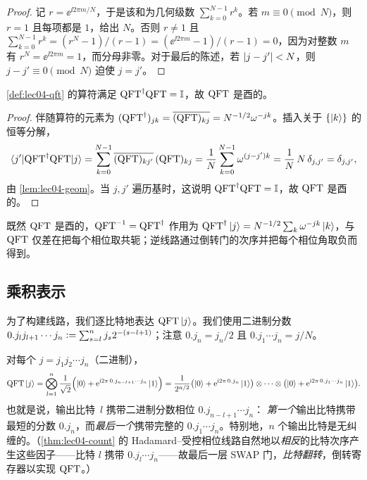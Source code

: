 \begin{proof}
记 $r=\ee^{\ii 2\pi m/N}$，于是该和为几何级数
$\sum_{k=0}^{N-1}r^{k}$。若 $m\equiv0\pmod N$，则 $r=1$ 且每项都是 $1$，给出 $N$。否则 $r\neq1$ 且
$\sum_{k=0}^{N-1}r^{k}=(r^{N}-1)/(r-1)=(\ee^{\ii 2\pi m}-1)/(r-1)=0$，因为对整数 $m$ 有
$r^{N}=\ee^{\ii 2\pi m}=1$，而分母非零。对于最后的陈述，若 $\left\lvert j-j' \right\rvert<N$，则 $j-j'\equiv0\pmod N$ 迫使 $j=j'$。
\end{proof}

\begin{theorem}
\label{thm:lec04-unitary}
\cref{def:lec04-qft} 的算符满足 $\mathrm{QFT}^{\dagger}\mathrm{QFT}=\mathbb{I}$，故 $\mathrm{QFT}$ 是酉的。
\end{theorem}

\begin{proof}
伴随算符的元素为 $(\mathrm{QFT}^{\dagger})_{jk}=\overline{(\mathrm{QFT})_{kj}}
=N^{-1/2}\omega^{-jk}$。插入关于
$\{\ket{k}\}$ 的恒等分解，
\[
  \braket{j'|\mathrm{QFT}^{\dagger}\mathrm{QFT}|j}
   =\sum_{k=0}^{N-1}\overline{(\mathrm{QFT})_{kj'}}\,(\mathrm{QFT})_{kj}
   =\frac{1}{N}\sum_{k=0}^{N-1}\omega^{(j-j')k}
   =\frac{1}{N}\,N\,\delta_{j,j'}=\delta_{j,j'},
\]
由 \cref{lem:lec04-geom}。当 $j,j'$ 遍历基时，这说明
$\mathrm{QFT}^{\dagger}\mathrm{QFT}=\mathbb{I}$，故 $\mathrm{QFT}$ 是酉的。
\end{proof}

既然 $\mathrm{QFT}$ 是酉的，$\mathrm{QFT}^{-1}=\mathrm{QFT}^{\dagger}$ 作用为
$\mathrm{QFT}^{\dagger}\ket{j}=N^{-1/2}\sum_k\omega^{-jk}\ket{k}$，与 $\mathrm{QFT}$ 仅差在把每个相位取共轭；逆线路通过倒转门的次序并把每个相位角取负而得到。

\subsection*{乘积表示}

为了构建线路，我们逐比特地表达 $\mathrm{QFT}\ket{j}$。我们使用二进制分数
$0.j_l j_{l+1}\cdots j_n\vcentcolon=\sum_{s=l}^{n} j_s 2^{-(s-l+1)}$；注意
$0.j_n=j_n/2$ 且 $0.j_1\cdots j_n=j/N$。

\begin{theorem}[乘积表示]
\label{thm:lec04-product}
对每个 $j=j_1 j_2\cdots j_n$（二进制），
\[
  \mathrm{QFT}\ket{j}
   =\bigotimes_{l=1}^{n}
     \frac{1}{\sqrt2}\Bigl(\ket{0}+\mathrm{e}^{\mathrm{i} 2\pi\,0.j_{n-l+1}\cdots j_n}\ket{1}\Bigr)
   =\frac{1}{2^{n/2}}
     \bigl(\ket{0}+\mathrm{e}^{\mathrm{i} 2\pi\,0.j_n}\ket{1}\bigr)\otimes\cdots\otimes
     \bigl(\ket{0}+\mathrm{e}^{\mathrm{i} 2\pi\,0.j_1\cdots j_n}\ket{1}\bigr).
\]
也就是说，输出比特~$l$ 携带二进制分数相位 $0.j_{n-l+1}\cdots j_n$：
\emph{第一个}输出比特携带最短的分数 $0.j_n$，而\emph{最后一个}携带完整的 $0.j_1\cdots j_n$。特别地，$n$ 个输出比特是无纠缠的。（\cref{thm:lec04-count} 的 Hadamard--受控相位线路自然地以\emph{相反}的比特次序产生这些因子——比特 $l$ 携带 $0.j_l\cdots j_n$——故最后一层 SWAP 门，\emph{比特翻转}，倒转寄存器以实现 $\mathrm{QFT}$。）
\end{theorem}

